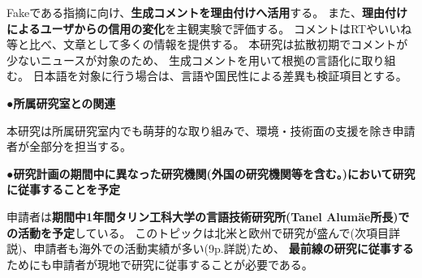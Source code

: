 {	Fakeである指摘に向け、\textbf{生成コメントを理由付けへ活用}する。
	また、\textbf{理由付けによるユーザからの信用の変化}を主観実験で評価する。
	コメントはRTやいいね等と⽐べ、⽂章として多くの情報を提供する。
	本研究は拡散初期でコメントが少ないニュースが対象のため、
	⽣成コメントを⽤いて根拠の⾔語化に取り組む。
	⽇本語を対象に⾏う場合は、⾔語や国⺠性による差異も検証項⽬とする。

	\noindent
	●\textbf{所属研究室との関連}

	本研究は所属研究室内でも萌芽的な取り組みで、環境・技術面の支援を除き申請者が全部分を担当する。

	\noindent
	●\textbf{研究計画の期間中に異なった研究機関(外国の研究機関等を含む。)において研究に従事することを予定}
	
	申請者は\textbf{期間中1年間タリン工科大学の言語技術研究所(Tanel Alumäe所長)での活動を予定}している。
	このトピックは北米と欧州で研究が盛んで(次項目詳説)、申請者も海外での活動実績が多い(9p.詳説)ため、
	\textbf{最前線の研究に従事する}ためにも申請者が現地で研究に従事することが必要である。

}

\newcommand{\人権の保護及び法令等の遵守への対応}{%
	コメント取得を予定してしているSNSはTwitterである。
	Twitter社は2020年3月より学術目的でTwitter APIの利用を自由化しているほか、
	取得したツイートIDを含む情報をデータセットとして公開することも学術目的であれば認められている\cite{twitter_2020}。

	また、先行研究が提供したデータセットを使用する場合は、提供者が示すライセンスやポリシーを遵守する。

	なお、学習済みモデルの公表は平成30年改正著作権法第30条4号により認められている。

	ただし、本研究では主観評価実験としてSNSユーザを対象としたアンケート調査を予定している。
	この調査により収集したデータは、個⼈の特定につながる情報を匿名化した上で解析を⾏い、
	解析結果の公表に際しては、匿名化を⾏ったデータを⽤い、個⼈情報の漏洩防⽌に配慮する。

	{\footnotesize
		\begin{thebibliography}{99}
			\setcounter{enumiv}{11}
			\bibitem{twitter_2020} Twitter開発者ポリシーを分かりやすくアップデート, 2020年3月11日. (最終閲覧日 2020年4月19日) \url{https://blog.twitter.com/developer/ja_jp/topics/tools/2020/DevPolicyUpdate.html}
		\end{thebibliography}
	}
}

